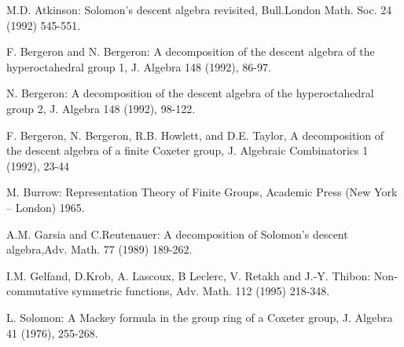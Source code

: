 \documentclass[10pt]{article}
\begin{document}
\begin{thebibliography}{99}

M.D. Atkinson: Solomon's descent algebra revisited,
 Bull.London Math. Soc. 24 (1992) 545-551.

F. Bergeron and N. Bergeron: A decomposition of the descent
algebra
of the hyperoctahedral group 1, J. Algebra 148 (1992), 86-97.

N. Bergeron: A decomposition of the descent algebra
of the hyperoctahedral group 2, J. Algebra 148 (1992), 98-122.

F. Bergeron, N. Bergeron, R.B. Howlett,  and D.E. Taylor,
A decomposition of the descent algebra of a finite
Coxeter group, J. Algebraic Combinatorics 1 (1992), 23-44

M. Burrow: Representation Theory of Finite Groups,
Academic Press (New York -- London) 1965.

 A.M. Garsia and C.Reutenauer: A decomposition of Solomon's
 descent algebra,Adv. Math. 77 (1989) 189-262.

I.M. Gelfand, D.Krob, A. Lascoux, B Leclerc, V. Retakh and
 J.-Y. Thibon: Non-commutative symmetric functions, Adv.
 Math. 112 (1995) 218-348.

L. Solomon: A Mackey formula in the group ring of a
Coxeter group, J. Algebra 41 (1976), 255-268.

\end{thebibliography}
\end{document}
